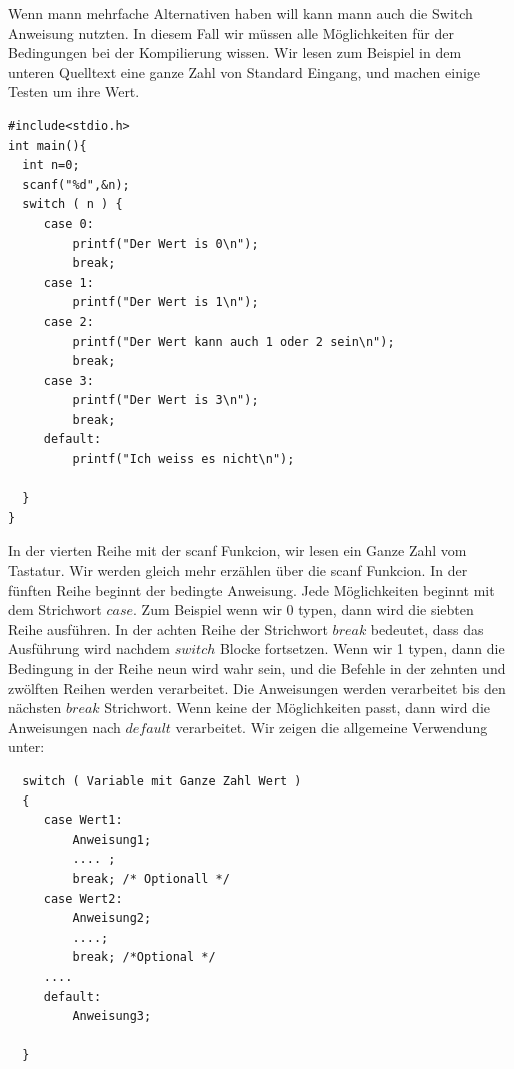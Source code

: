 \documentclass{article}[12pt]
\begin{document}
Wenn mann mehrfache Alternativen haben will kann mann auch die Switch Anweisung nutzten. In diesem Fall wir müssen 
alle Möglichkeiten für der Bedingungen bei der Kompilierung wissen. Wir lesen zum Beispiel in dem unteren Quelltext eine
ganze Zahl von Standard Eingang, und machen einige Testen um ihre Wert.
\begin{lstlisting}
#include<stdio.h>
int main(){
  int n=0;
  scanf("%d",&n);
  switch ( n ) {
     case 0: 
         printf("Der Wert is 0\n");
         break;
     case 1:
         printf("Der Wert is 1\n");
     case 2:
         printf("Der Wert kann auch 1 oder 2 sein\n");
         break;
     case 3:
         printf("Der Wert is 3\n");
         break;
     default:
         printf("Ich weiss es nicht\n");
     
  }
}
\end{lstlisting}
In der vierten Reihe mit der scanf Funkcion, wir lesen ein Ganze Zahl vom Tastatur. Wir werden gleich mehr erzählen über die
scanf Funkcion. In der fünften Reihe beginnt der bedingte Anweisung. Jede Möglichkeiten beginnt mit dem Strichwort $case$.
Zum Beispiel wenn wir 0 typen, dann wird die siebten Reihe ausführen. In der achten Reihe der Strichwort $break$ bedeutet, dass
das Ausführung wird nachdem $switch$ Blocke fortsetzen. Wenn wir 1 typen, dann die Bedingung in der Reihe neun wird wahr sein, und
die Befehle in der zehnten und zwölften Reihen werden verarbeitet. Die Anweisungen werden verarbeitet bis den nächsten $break$ 
Strichwort. Wenn keine der Möglichkeiten passt, dann wird die Anweisungen nach $default$ verarbeitet.  Wir zeigen die allgemeine
Verwendung unter:

\begin{lstlisting}
  switch ( Variable mit Ganze Zahl Wert )
  {
     case Wert1:
         Anweisung1;
         .... ;
         break; /* Optionall */
     case Wert2:
         Anweisung2;
         ....; 
         break; /*Optional */
     ....
     default:
         Anweisung3;

  }
\end{lstlisting}
\end{document}
